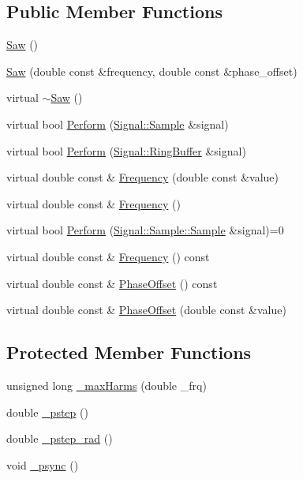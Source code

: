 \subsection*{Public Member Functions}
\begin{DoxyCompactItemize}
\item 
\hyperlink{classDSG_1_1Fourier_1_1Saw_a8be934007e9f0c9b3c73f90017318393}{Saw} ()
\item 
\hyperlink{classDSG_1_1Fourier_1_1Saw_a8521a9e9988cc8bf7d1e8ce42938c0eb}{Saw} (double const \&frequency, double const \&phase\-\_\-offset)
\item 
virtual \hyperlink{classDSG_1_1Fourier_1_1Saw_a10b84f69aa39500f0f670ac3e7a5b0e5}{$\sim$\-Saw} ()
\item 
virtual bool \hyperlink{classDSG_1_1Fourier_1_1Saw_a9523e6d9ccacd923a94377751f913f44}{Perform} (\hyperlink{classDSG_1_1Signal_1_1Sample}{Signal\-::\-Sample} \&signal)
\item 
virtual bool \hyperlink{classDSG_1_1Fourier_1_1Saw_ab1c13653fe0334a1a5948021241385dc}{Perform} (\hyperlink{classDSG_1_1Signal_1_1RingBuffer}{Signal\-::\-Ring\-Buffer} \&signal)
\item 
virtual double const \& \hyperlink{classDSG_1_1Fourier_1_1Saw_ac8472df8e25d930bd4336699a0dcd338}{Frequency} (double const \&value)
\item 
virtual double const \& \hyperlink{classDSG_1_1Fourier_1_1Saw_a8a17f6a855e14aeb7edd0dc8e789f0ad}{Frequency} ()
\item 
virtual bool \hyperlink{classDSG_1_1SignalProcess_ae8a803d175eca1ec5f34a52035a082b4}{Perform} (\hyperlink{classDSG_1_1Signal_1_1Sample_a21db6fade3ee3554ed3887cb2b74daff}{Signal\-::\-Sample\-::\-Sample} \&signal)=0
\item 
virtual double const \& \hyperlink{classDSG_1_1SignalGenerator_aedac746c5a70818d120858542ecb7c45}{Frequency} () const 
\item 
virtual double const \& \hyperlink{classDSG_1_1SignalGenerator_a1ce521847edd0b837fd840998f906b4b}{Phase\-Offset} () const 
\item 
virtual double const \& \hyperlink{classDSG_1_1SignalGenerator_a08b71b1f30ba65e629642c570291dc0e}{Phase\-Offset} (double const \&value)
\end{DoxyCompactItemize}
\subsection*{Protected Member Functions}
\begin{DoxyCompactItemize}
\item 
unsigned long \hyperlink{classDSG_1_1Fourier_1_1FourierGenerator_a38d0cc3f7f26e89379626627c17ae33a}{\-\_\-max\-Harms} (double \-\_\-frq)
\item 
double \hyperlink{classDSG_1_1SignalGenerator_ac0d781b8673b3a283bf7c133290ede50}{\-\_\-pstep} ()
\item 
double \hyperlink{classDSG_1_1SignalGenerator_ae660eb4caa88b8d278f8d24d0908a487}{\-\_\-pstep\-\_\-rad} ()
\item 
void \hyperlink{classDSG_1_1SignalGenerator_a05baccb38d1e52860d4fcf7cb8430efc}{\-\_\-psync} ()
\end{DoxyCompactItemize}
